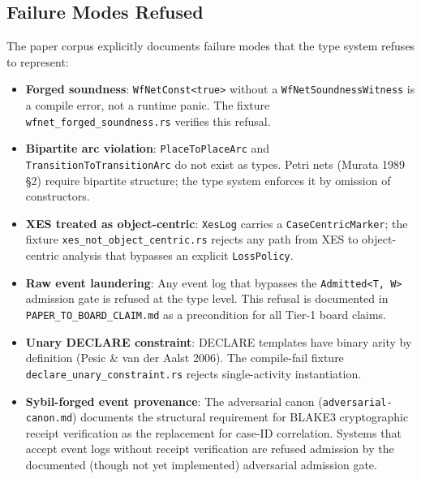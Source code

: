 \subsection{Failure Modes Refused}
\label{sec:sources-papers-arch-failures}

The paper corpus explicitly documents failure modes that the type system
refuses to represent:

\begin{itemize}
  \item \textbf{Forged soundness}: \texttt{WfNetConst<true>} without a
    \texttt{WfNetSoundnessWitness} is a compile error, not a runtime panic.
    The fixture \texttt{wfnet\_forged\_soundness.rs} verifies this refusal.
  \item \textbf{Bipartite arc violation}: \texttt{PlaceToPlaceArc} and
    \texttt{TransitionToTransitionArc} do not exist as types. Petri nets
    (Murata 1989 \S2) require bipartite structure; the type system enforces
    it by omission of constructors.
  \item \textbf{XES treated as object-centric}: \texttt{XesLog} carries a
    \texttt{CaseCentricMarker}; the fixture \texttt{xes\_not\_object\_centric.rs}
    rejects any path from XES to object-centric analysis that bypasses an
    explicit \texttt{LossPolicy}.
  \item \textbf{Raw event laundering}: Any event log that bypasses the
    \texttt{Admitted<T, W>} admission gate is refused at the type level.
    This refusal is documented in \texttt{PAPER\_TO\_BOARD\_CLAIM.md} as a
    precondition for all Tier-1 board claims.
  \item \textbf{Unary DECLARE constraint}: DECLARE templates have binary arity
    by definition (Pesic \& van der Aalst 2006). The compile-fail fixture
    \texttt{declare\_unary\_constraint.rs} rejects single-activity instantiation.
  \item \textbf{Sybil-forged event provenance}: The adversarial canon
    (\texttt{adversarial-canon.md}) documents the structural requirement for
    BLAKE3 cryptographic receipt verification as the replacement for case-ID
    correlation. Systems that accept event logs without receipt verification
    are refused admission by the documented (though not yet implemented)
    adversarial admission gate.
\end{itemize}

